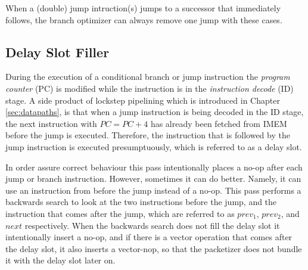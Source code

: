 When a (double) jump intruction(s) jumps to a successor that immediately follows, the branch optimizer can always remove one jump with these cases.




\subsection{Delay Slot Filler}
During the execution of a conditional branch or jump instruction the \emph{program counter} (PC) is modified while the instruction is in the \emph{instruction decode} (ID) stage. A side product of lockstep pipelining which is introduced in Chapter \ref{sec:datapaths}, is that when a jump instruction is being decoded in the ID stage, the next instruction with $PC = PC+4$ has already been fetched from IMEM before the jump is executed. Therefore, the instruction that is followed by the jump instruction is executed presumptuously, which is referred to as a delay slot.


In order assure correct behaviour this pass intentionally 
places a no-op after each jump or branch instruction. However, sometimes it can do better. Namely, it can use an instruction from before the jump instead of a no-op. This pass performs a backwards search to look at the two instructions before the jump, and the instruction that comes after the jump, which are referred to as $prev_1$, $prev_2$, and $next$ respectively. When the backwards search does not fill the delay slot it intentionally insert a no-op, and if there is a vector operation that comes after the delay slot, it also inserts a vector-nop, so that the packetizer does not bundle it with the delay slot later on.


